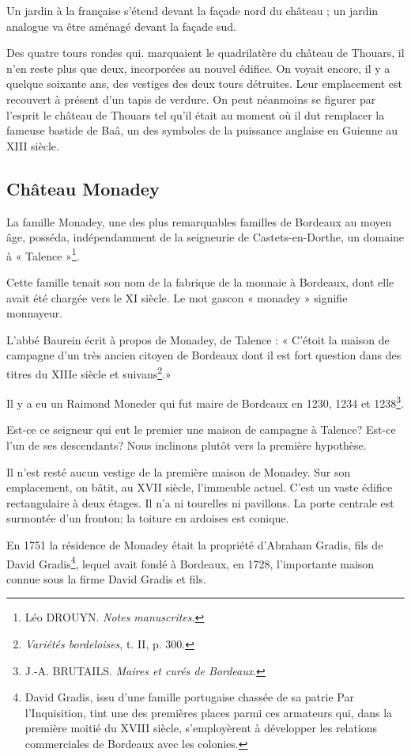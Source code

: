 Un jardin à la française s'étend devant la façade nord du château ; un jardin analogue va être aménagé devant la façade sud.

Des quatre tours rondes qui. marquaient le quadrilatère du château de Thouars, il n'en reste plus que deux, incorporées au nouvel édifice. On voyait encore, il y a quelque soixante ans, des vestiges des deux tours détruites. Leur emplacement est recouvert à présent d'un tapis de verdure. On peut néanmoins se figurer par l'esprit le château de Thouars tel qu'il était au moment où il dut remplacer la fameuse bastide de Baâ, un des symboles de la puissance anglaise en Guienne au XIII\ieme{} siècle. 

\subsection{Château Monadey}

La famille Monadey, une des plus remarquables familles de Bordeaux au moyen âge, posséda, indépendamment de la seigneurie de Castets-en-Dorthe, un domaine à « Talence »\footnote{Léo DROUYN. \textit{Notes manuscrites}.}.

Cette famille tenait son nom de la fabrique de la monnaie à Bordeaux, dont elle avait été chargée vers le XI\ieme{} siècle. Le mot gascon « monadey » signifie monnayeur.

L'abbé Baurein écrit à propos de Monadey, de Talence : « C'étoit la maison de campagne d'un très ancien citoyen de Bordeaux dont il est fort question dans des titres du XIIIe siècle et suivans\footnote{\textit{Variétés bordeloises}, t. II, p. 300.}.»

Il y a eu un Raimond Moneder qui fut maire de Bordeaux en 1230, 1234 et 1238\footnote{J.-A. BRUTAILS. \textit{Maires et curés de Bordeaux}.}.

Est-ce ce seigneur qui eut le premier une maison de campagne à Talence? Est-ce l'un de ses descendants? Nous inclinons plutôt vers la première hypothèse.

Il n'est resté aucun vestige de la première maison de Monadey. Sur son emplacement, on bâtit, au XVII\ieme{} siècle, l'immeuble actuel. C'est un vaste édifice rectangulaire à deux étages. Il n'a ni tourelles ni pavillons. La porte centrale est surmontée d'un fronton; la toiture en ardoises est conique.

En 1751 la résidence de Monadey était la propriété d'Abraham Gradis, fils de David Gradis\footnote{David Gradis, issu d'une famille portugaise chassée de sa patrie Par l'Inquisition, tint une des premières places parmi ces armateurs qui, dans la première moitié du XVIII\ieme{} siècle, s'employèrent à développer les relations commerciales de Bordeaux avec les colonies.}, lequel avait fondé à Bordeaux, en 1728, l'importante maison connue sous la firme David Gradis et fils.


